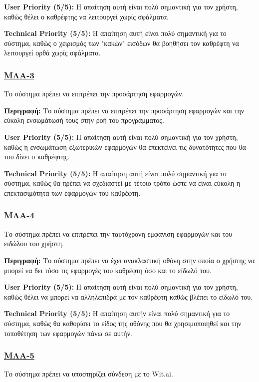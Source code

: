 \noindent\textbf{User Priority (5/5):} Η απαίτηση αυτή είναι πολύ σημαντική για τον χρήστη, καθώς θέλει ο καθρέφτης να λειτουργεί χωρίς σφάλματα.

\noindent\textbf{Technical Priority (5/5):} Η απαίτηση αυτή είναι πολύ σημαντική για το σύστημα, καθώς ο χειρισμός των "κακών" εισόδων θα βοηθήσει τον καθρέφτη να λειτουργεί ορθά χωρίς σφάλματα.

\subsubsection{\underline{ΜΛΑ-3}}
\noindent Το σύστημα πρέπει να επιτρέπει την προσάρτηση εφαρμογών.

\noindent\textbf{Περιγραφή:} Το σύστημα πρέπει να επιτρέπει την προσάρτηση εφαρμογών και την εύκολη ενσωμάτωσή τους στην ροή του προγράμματος.

\noindent\textbf{User Priority (5/5):} Η απαίτηση αυτή είναι πολύ σημαντική για τον χρήστη, καθώς η ενσωμάτωση εξωτερικών εφαρμογών θα επεκτείνει τις δυνατότητες που θα του δίνει ο καθρέφτης.

\noindent\textbf{Technical Priority (5/5):} Η απαίτηση αυτή είναι πολύ σημαντική για το σύστημα, καθώς θα πρέπει να σχεδιαστεί με τέτοιο τρόπο ώστε να είναι εύκολη η επεκτασιμότητα των εφαρμογών του καθρέφτη.

\subsubsection{\underline{ΜΛΑ-4}}
\noindent Το σύστημα πρέπει να επιτρέπει την ταυτόχρονη εμφάνιση εφαρμογών και του ειδώλου του χρήστη.

\noindent\textbf{Περιγραφή:} Το σύστημα πρέπει να έχει ανακλαστική οθόνη στην οποία ο χρήστης να μπορεί να δει τόσο τις εφαρμογές του καθρέφτη όσο και το είδωλό του.

\noindent\textbf{User Priority (5/5):} Η απαίτηση αυτή είναι πολύ σημαντική για τον χρήστη, καθώς θέλει να μπορεί να αλληλεπιδρά με τον καθρέφτη καθώς βλέπει το είδωλό του.

\noindent\textbf{Technical Priority (5/5):} Η απαίτηση αυτήν είναι πολύ σημαντική για το σύστημα, καθώς θα καθορίσει το είδος της οθόνης που θα χρησιμοποιηθεί και την τοποθέτηση των εφαρμογών πάνω σε αυτήν.

\subsubsection{\underline{ΜΛΑ-5}}
\noindent Το σύστημα πρέπει να υποστηρίζει σύνδεση με το Wit.ai.

